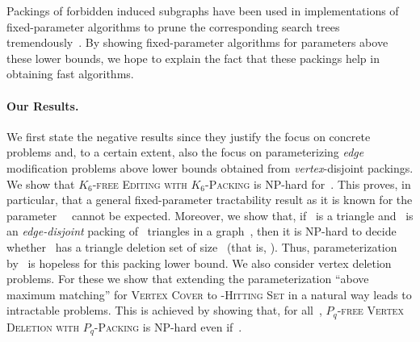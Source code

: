\documentclass[envcountsame,numbook,smallextended]{svjour3}
\numberwithin{equation}{section}
\numberwithin{figure}{section}
\newcommand{\gfedv}[1]{\textsc{\ensuremath{#1}-free Editing with \ensuremath{#1}-Packing}}
\newcommand{\PLVD}{\textsc{\ensuremath{P_q}-free Vertex Deletion with  \ensuremath{P_q}-Packing}}
\begin{document}
Packings of forbidden induced subgraphs have been used in implementations of fixed-parameter algorithms to prune the corresponding search trees tremendously~\cite{HH15}. By showing fixed-parameter algorithms for parameters above these lower bounds, we hope to explain the fact that these packings help in obtaining fast algorithms.


\paragraph{Our Results.}We first state the negative results since they
justify the focus on concrete problems and, to a certain extent, also
the focus on parameterizing \emph{edge} modification problems above
lower bounds obtained from
\emph{vertex}-disjoint packings. We show that \gfedv{K_6} is NP-hard
for~. This proves, in particular, that a general
fixed-parameter tractability result as it is known for the
parameter~~\cite{Cai96} cannot be expected. Moreover, we show that,
if~ is a triangle and~ is an \emph{edge-disjoint} packing
of~ triangles in a graph~, then it is NP-hard to decide
whether~ has a triangle deletion set of size~ (that is,
). Thus, parameterization by~ is hopeless for this
packing lower bound. We also consider vertex deletion problems. For
these we show that extending the parameterization ``above maximum
matching'' for \textsc{Vertex Cover} to \textsc{-Hitting Set} in a
natural way leads to intractable problems. This is achieved by showing
that, for all~, \PLVD{} is NP-hard even if~.
\end{document}

